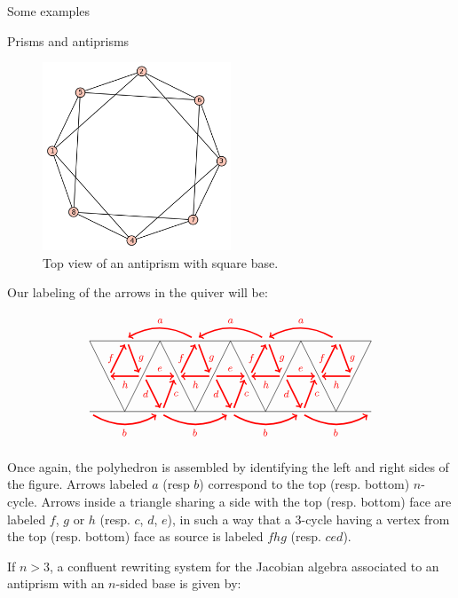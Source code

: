 \begin{chapter}{Some examples}
\begin{section}{Prisms and antiprisms}
\begin{figure}[h]
\centering
	\includegraphics[width=0.5\textwidth]{antiprism.png}
\caption{Top view of an antiprism with square base.}
\end{figure}

Our labeling of the arrows in the quiver will be:


\[
\begin{tikzpicture}[text width=1.5mm, font=\footnotesize]
\draw (-4, 0) -- (4, 0);
\draw (-4, 2) -- (4, 2);
\foreach \x in {-4,-2,...,2}
{
\draw (\x, 2) -- (\x+1, 0);
\draw (\x+1, 0) -- (\x+2, 2);
}
\foreach \x in {-3,-1,...,1}
{
\draw[<-, red, very thick] (\x+0.1, 2.1) to [bend left] node[above]{$a$} (\x+1.9, 2.1);
\draw[->, red, very thick] (\x+0.6, 1) to node[above]{$e$} (\x+1.4, 1);
\draw[->, red, very thick] (\x+0.6, 0.9) to node[left]{$d$} (\x+1, 0.1);
\draw[->, red, very thick] (\x+1.1, 0.1) to node[right]{$c$} (\x+1.4, 0.9);
}

\foreach \x in {-4,-2,...,2}
{
\draw[->, red, very thick] (\x+0.1, -0.1) to [bend right] node[below]{$b$} (\x+1.9, -0.1);
\draw[<-, red, very thick] (\x+0.6, 1) to node[below]{$h$} (\x+1.4, 1);
\draw[->, red, very thick] (\x+0.6, 1.1) to node[left]{$f$} (\x+1, 1.9);
\draw[->, red, very thick] (\x+1.1, 1.9) to node[right]{$g$} (\x+1.4, 1.1);
}
\end{tikzpicture}
\]

Once again, the polyhedron is assembled by identifying the left and right sides of the figure. Arrows labeled $a$ (resp $b$) correspond to the top (resp. bottom) $n$-cycle. Arrows inside a triangle sharing a side with the top (resp. bottom) face are labeled $f$, $g$ or $h$ (resp. $c$, $d$, $e$), in such a way that a 3-cycle having a vertex from the top (resp. bottom) face as source is labeled $fhg$ (resp. $ced$).

If $n>3$, a confluent rewriting system for the Jacobian algebra associated to an antiprism with an $n$-sided base is given by:


\end{section}
\end{chapter}
